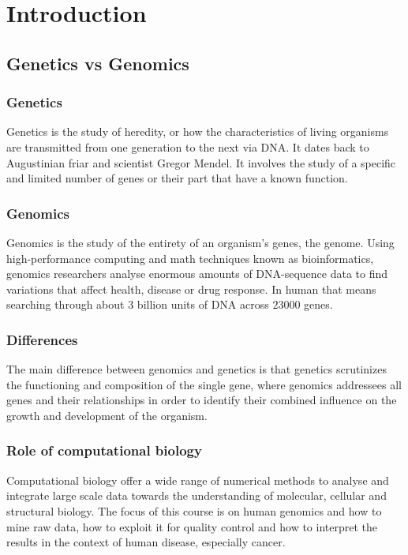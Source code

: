 \graphicspath{{chapters/01/}}
\chapter{Introduction}

\section{Genetics vs Genomics}

	\subsection{Genetics}
	Genetics is the study of heredity, or how the characteristics of living organisms are transmitted from one generation to the next via DNA.
	It dates back to Augustinian friar and scientist Gregor Mendel.
	It involves the study of a specific and limited number of genes or their part that have a known function.

	\subsection{Genomics}
	Genomics is the study of the entirety of an organism's genes, the genome.
	Using high-performance computing and math techniques known as bioinformatics, genomics researchers analyse enormous amounts of DNA-sequence data to find variations that affect health, disease or drug response.
	In human that means searching through about $3$ billion units of DNA across $23000$ genes.

	\subsection{Differences}
	The main difference between genomics and genetics is that genetics scrutinizes the functioning and composition of the single gene, where genomics addressees all genes and their relationships in order to identify their combined influence on the growth and development of the organism.

	\subsection{Role of computational biology}
	Computational biology offer a wide range of numerical methods to analyse and integrate large scale data towards the understanding of molecular, cellular and structural biology.
	The focus of this course is on human genomics and how to mine raw data, how to exploit it for quality control and how to interpret the results in the context of human disease, especially cancer.

